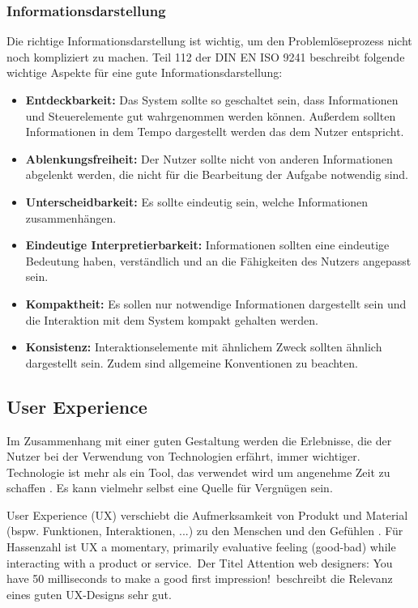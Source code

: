 \subsubsection*{Informationsdarstellung}
Die richtige Informationsdarstellung ist wichtig, um den Problemlöseprozess nicht noch kompliziert zu machen. Teil 112 \cite{ISO9241-112} der DIN EN ISO 9241 beschreibt folgende wichtige Aspekte für eine gute Informationsdarstellung:
\begin{itemize}
\item \textbf{Entdeckbarkeit:} Das System sollte so geschaltet sein, dass Informationen und Steuerelemente gut wahrgenommen werden können. Außerdem sollten Informationen in dem Tempo dargestellt werden das dem Nutzer entspricht.
\item \textbf{Ablenkungsfreiheit:} Der Nutzer sollte nicht von anderen Informationen abgelenkt werden, die nicht für die Bearbeitung der Aufgabe notwendig sind.
\item \textbf{Unterscheidbarkeit:} Es sollte eindeutig sein, welche Informationen zusammenhängen.
\item \textbf{Eindeutige Interpretierbarkeit:} Informationen sollten eine eindeutige Bedeutung haben, verständlich und an die Fähigkeiten des Nutzers angepasst sein.
\item \textbf{Kompaktheit:} Es sollen nur notwendige Informationen dargestellt sein und die Interaktion mit dem System kompakt gehalten werden.
\item \textbf{Konsistenz:} Interaktionselemente mit ähnlichem Zweck sollten ähnlich dargestellt sein. Zudem sind allgemeine Konventionen zu beachten.
\end{itemize}

\subsection{User Experience}
Im Zusammenhang mit einer guten Gestaltung werden die Erlebnisse, die der Nutzer bei der Verwendung von Technologien erfährt, immer wichtiger. Technologie ist mehr als ein Tool, das verwendet wird um angenehme Zeit zu schaffen . Es kann vielmehr selbst eine Quelle für Vergnügen sein. \cite{Hassenzahl2008}

User Experience (UX) verschiebt die Aufmerksamkeit von Produkt und Material (bspw. Funktionen, Interaktionen, ...) zu den Menschen und den Gefühlen \cite{Hassenzahl2008}. Für Hassenzahl \citep[12]{Hassenzahl2008} ist UX \glqq a momentary, primarily evaluative feeling (good-bad) while interacting with a product or service.\grqq \ Der Titel \glqq Attention web designers: You have 50 milliseconds to make a good first impression!\grqq \ beschreibt die Relevanz eines guten UX-Designs sehr gut. 
\cite{Hassenzahl2006}

